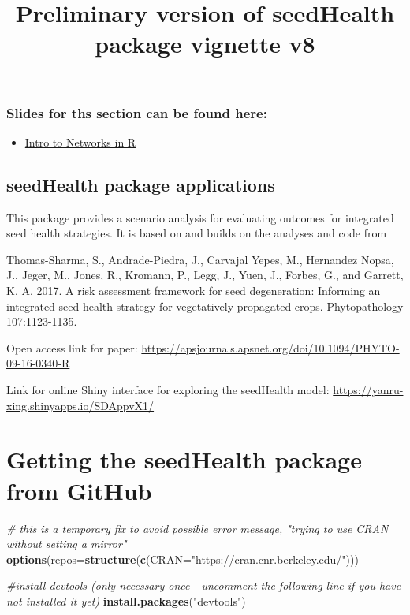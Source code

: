 \documentclass[]{article}
\title{Preliminary version of seedHealth package vignette v8}
\author{}
\date{}
\newenvironment{Shaded}{\begin{snugshade}}{\end{snugshade}}
\newcommand{\KeywordTok}[1]{\textcolor[rgb]{0.13,0.29,0.53}{\textbf{#1}}}
\newcommand{\DataTypeTok}[1]{\textcolor[rgb]{0.13,0.29,0.53}{#1}}
\newcommand{\StringTok}[1]{\textcolor[rgb]{0.31,0.60,0.02}{#1}}
\newcommand{\CommentTok}[1]{\textcolor[rgb]{0.56,0.35,0.01}{\textit{#1}}}
\newcommand{\NormalTok}[1]{#1}
\providecommand{\tightlist}{%
  \setlength{\itemsep}{0pt}\setlength{\parskip}{0pt}}
\begin{document}
\maketitle

\subsubsection{Slides for ths section can be found
here:}\label{slides-for-ths-section-can-be-found-here}

\begin{itemize}
\tightlist
\item
  \href{PDFFiles/R\%20packages\%20seedHealth\%20and\%20INAprelim.pdf}{Intro
  to Networks in R}
\end{itemize}

\subsection{seedHealth package
applications}\label{seedhealth-package-applications}

This package provides a scenario analysis for evaluating outcomes for
integrated seed health strategies. It is based on and builds on the
analyses and code from

Thomas-Sharma, S., Andrade-Piedra, J., Carvajal Yepes, M., Hernandez
Nopsa, J., Jeger, M., Jones, R., Kromann, P., Legg, J., Yuen, J.,
Forbes, G., and Garrett, K. A. 2017. A risk assessment framework for
seed degeneration: Informing an integrated seed health strategy for
vegetatively-propagated crops. Phytopathology 107:1123-1135.

Open access link for paper:
\url{https://apsjournals.apsnet.org/doi/10.1094/PHYTO-09-16-0340-R}

Link for online Shiny interface for exploring the seedHealth model:
\url{https://yanru-xing.shinyapps.io/SDAppvX1/}

\section{Getting the seedHealth package from
GitHub}\label{getting-the-seedhealth-package-from-github}

\begin{Shaded}
\begin{Highlighting}[]
\CommentTok{# this is a temporary fix to avoid possible error message, "trying to use CRAN without setting a mirror"}
\KeywordTok{options}\NormalTok{(}\DataTypeTok{repos=}\KeywordTok{structure}\NormalTok{(}\KeywordTok{c}\NormalTok{(}\DataTypeTok{CRAN=}\StringTok{"https://cran.cnr.berkeley.edu/"}\NormalTok{)))}

\CommentTok{#install devtools (only necessary once - uncomment the following line if you have not installed it yet)}
\KeywordTok{install.packages}\NormalTok{(}\StringTok{"devtools"}\NormalTok{)}
\end{Highlighting}
\end{Shaded}
\end{document}
